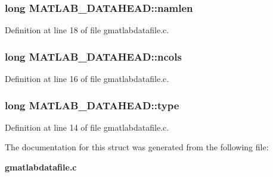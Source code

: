 \subsubsection[{namlen}]{\setlength{\rightskip}{0pt plus 5cm}long {\bf MATLAB\_\-DATAHEAD::namlen}}\label{structMATLAB__DATAHEAD_ad6e65844dcff1eb1cf7bf8752ba9a91c}


Definition at line 18 of file gmatlabdatafile.c.
\subsubsection[{ncols}]{\setlength{\rightskip}{0pt plus 5cm}long {\bf MATLAB\_\-DATAHEAD::ncols}}\label{structMATLAB__DATAHEAD_ae87d8eca5290fa03d01c79061498626f}


Definition at line 16 of file gmatlabdatafile.c.
\subsubsection[{type}]{\setlength{\rightskip}{0pt plus 5cm}long {\bf MATLAB\_\-DATAHEAD::type}}\label{structMATLAB__DATAHEAD_ad3587e58da5ca6cbe3cd98d5e2f46202}


Definition at line 14 of file gmatlabdatafile.c.

The documentation for this struct was generated from the following file:\begin{DoxyCompactItemize}
\item 
{\bf gmatlabdatafile.c}\end{DoxyCompactItemize}
